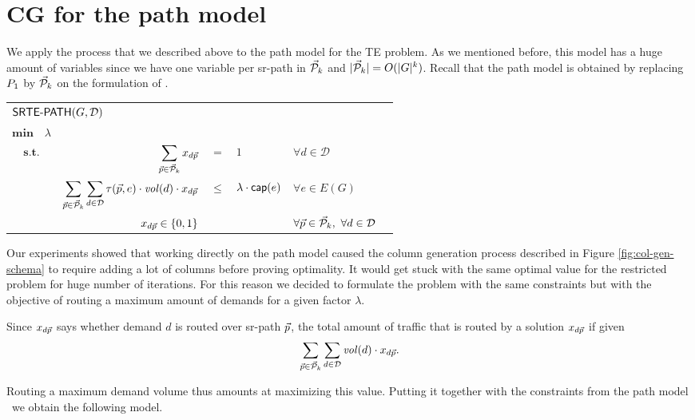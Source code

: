 \section{CG for the path model}

We apply the process that we described above to the path model for the TE problem. As we mentioned before,
this model has a huge amount of variables since we have one variable per sr-path in $\mathcal{\vec{P}}_k$ and $|\mathcal{\vec{P}}_k| = O(|G|^k)$. Recall that 
the path model is obtained by replacing $P_1$ by $\mathcal{\vec{P}}_k$ on the formulation of \bhatia.

\begin{center}
\begin{tabular}{crcllr}
\multicolumn{5}{l}{$\textsf{SRTE-PATH}(G, \mathcal{D})$} \\[0.5cm] 
$\displaystyle \mathbf{min} \quad \lambda$ & & & & & \\[0.5cm]
$\textbf{s.t.}$ & $\displaystyle \sum_{\vec{p} \in \mathcal{\vec{P}}_k} x_{d \vec{p}}$ & $=$ & $1$ & $\forall d \in \mathcal{D}$ \\[0.5cm] 
& $\displaystyle \sum_{\vec{p} \in \mathcal{\vec{P}}_k} \sum_{d \in \mathcal{D}} \tau(\vec{p}, e)  \cdot \mathit{vol}(d) \cdot x_{d \vec{p}}$ & $\leq$ & $\lambda \cdot \mathsf{cap}(e)$ & $\forall e \in E(G)$ \\[0.5cm]
& $x_{d\vec{p}} \in \{ 0, 1 \}$ & & & $\forall \vec{p} \in \mathcal{\vec{P}}_k, \ \forall d \in \mathcal{D}$
\end{tabular}
\end{center}

Our experiments showed that working directly on the path model caused the column generation process described in Figure \ref{fig:col-gen-schema}
to require adding a lot of columns before proving optimality. It would get stuck with the same optimal value for the restricted problem
for huge number of iterations. For this reason we decided to formulate the problem with the same constraints but with the objective of routing
a maximum amount of demands for a given factor $\lambda$.

Since $x_{d \vec{p}}$ says whether demand $d$ is routed over sr-path $\vec{p}$, the total amount of traffic that is routed by a solution $x_{d\vec{p}}$ 
if given 
$$
\sum_{\vec{p} \in \mathcal{\vec{P}}_k} \sum_{d \in \mathcal{D}} \mathit{vol}(d) \cdot x_{d\vec{p}}.
$$

Routing a maximum demand volume thus amounts at maximizing this value. Putting it together with the constraints from the path model \srtepath~we obtain the 
following model.

